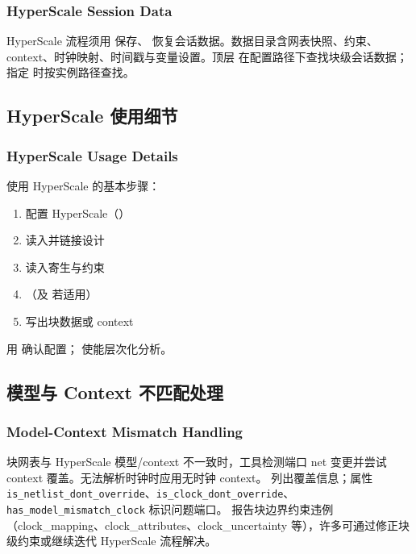 \subsubsection*{HyperScale Session Data}

HyperScale 流程须用  保存、 恢复会话数据。数据目录含网表快照、约束、context、时钟映射、时间戳与变量设置。顶层  在配置路径下查找块级会话数据；指定  时按实例路径查找。

\subsection{HyperScale 使用细节}
\subsubsection*{HyperScale Usage Details}

使用 HyperScale 的基本步骤：
\begin{enumerate}
  \item 配置 HyperScale（）
  \item 读入并链接设计
  \item 读入寄生与约束
  \item {}（及  若适用）
  \item {} 写出块数据或 context
\end{enumerate}

用  确认配置； 使能层次化分析。

\subsection{模型与 Context 不匹配处理}
\subsubsection*{Model-Context Mismatch Handling}

块网表与 HyperScale 模型/context 不一致时，工具检测端口 net 变更并尝试 context 覆盖。无法解析时钟时应用无时钟 context。 列出覆盖信息；属性 \texttt{is\_netlist\_dont\_override}、\texttt{is\_clock\_dont\_override}、\texttt{has\_model\_mismatch\_clock} 标识问题端口。 报告块边界约束违例（clock\_mapping、clock\_attributes、clock\_uncertainty 等），许多可通过修正块级约束或继续迭代 HyperScale 流程解决。

